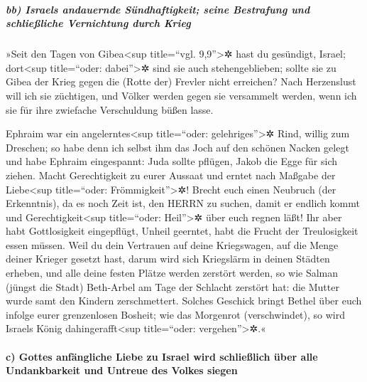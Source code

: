 \hypertarget{bb-israels-andauernde-suxfcndhaftigkeit-seine-bestrafung-und-schlieuxdfliche-vernichtung-durch-krieg}{%
\subparagraph{bb) Israels andauernde Sündhaftigkeit; seine Bestrafung
und schließliche Vernichtung durch
Krieg}\label{bb-israels-andauernde-suxfcndhaftigkeit-seine-bestrafung-und-schlieuxdfliche-vernichtung-durch-krieg}}

 »Seit den Tagen von Gibea\textless sup title=``vgl.
9,9''\textgreater✲ hast du gesündigt, Israel; dort\textless sup
title=``oder: dabei''\textgreater✲ sind sie auch stehengeblieben; sollte
sie zu Gibea der Krieg gegen die (Rotte der) Frevler nicht erreichen?
 Nach Herzenslust will ich sie züchtigen, und Völker
werden gegen sie versammelt werden, wenn ich sie für ihre zwiefache
Verschuldung büßen lasse.

 Ephraim war ein angelerntes\textless sup title=``oder:
gelehriges''\textgreater✲ Rind, willig zum Dreschen; so habe denn ich
selbst ihm das Joch auf den schönen Nacken gelegt und habe Ephraim
eingespannt: Juda sollte pflügen, Jakob die Egge für sich ziehen.
 Macht Gerechtigkeit zu eurer Aussaat und erntet nach
Maßgabe der Liebe\textless sup title=``oder: Frömmigkeit''\textgreater✲!
Brecht euch einen Neubruch (der Erkenntnis), da es noch Zeit ist, den
HERRN zu suchen, damit er endlich kommt und Gerechtigkeit\textless sup
title=``oder: Heil''\textgreater✲ über euch regnen läßt! 
Ihr aber habt Gottlosigkeit eingepflügt, Unheil geerntet, habt die
Frucht der Treulosigkeit essen müssen. Weil du dein Vertrauen auf deine
Kriegswagen, auf die Menge deiner Krieger gesetzt hast, 
darum wird sich Kriegslärm in deinen Städten erheben, und alle deine
festen Plätze werden zerstört werden, so wie Salman (jüngst die Stadt)
Beth-Arbel am Tage der Schlacht zerstört hat: die Mutter wurde samt den
Kindern zerschmettert.  Solches Geschick bringt Bethel
über euch infolge eurer grenzenlosen Bosheit; wie das Morgenrot
(verschwindet), so wird Israels König dahingerafft\textless sup
title=``oder: vergehen''\textgreater✲.«

\hypertarget{c-gottes-anfuxe4ngliche-liebe-zu-israel-wird-schlieuxdflich-uxfcber-alle-undankbarkeit-und-untreue-des-volkes-siegen}{%
\paragraph{c) Gottes anfängliche Liebe zu Israel wird schließlich über
alle Undankbarkeit und Untreue des Volkes
siegen}\label{c-gottes-anfuxe4ngliche-liebe-zu-israel-wird-schlieuxdflich-uxfcber-alle-undankbarkeit-und-untreue-des-volkes-siegen}}

